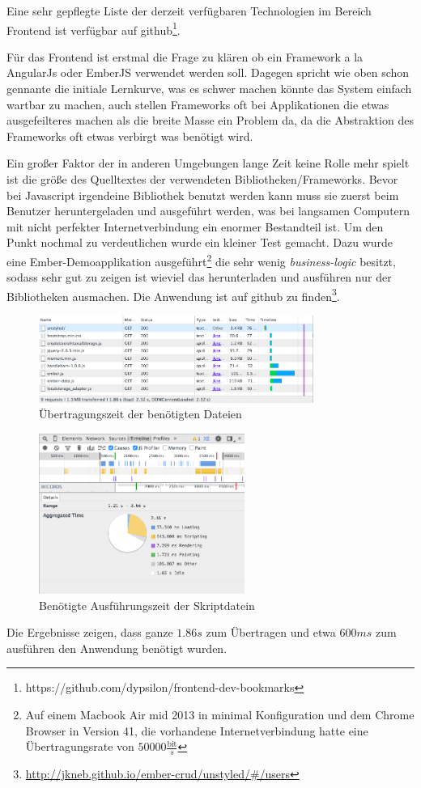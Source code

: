 \documentclass[12pt,twoside]{book}
\begin{document}
Eine sehr gepflegte Liste der derzeit verfügbaren Technologien im Bereich Frontend ist verfügbar auf github\footnote{https://github.com/dypsilon/frontend-dev-bookmarks}.

Für das Frontend ist erstmal die Frage zu klären ob ein Framework a la AngularJs oder EmberJS verwendet werden soll. Dagegen spricht wie oben schon gennante die initiale Lernkurve, was es schwer machen könnte das System einfach wartbar zu machen, auch stellen Frameworks oft bei Applikationen die etwas ausgefeilteres machen als die breite Masse ein Problem da, da die Abstraktion des Frameworks oft etwas verbirgt was benötigt wird.

Ein großer Faktor der in anderen Umgebungen lange Zeit keine Rolle mehr spielt ist die größe des Quelltextes der verwendeten Bibliotheken/Frameworks. Bevor bei Javascript irgendeine Bibliothek benutzt werden kann muss sie zuerst beim Benutzer heruntergeladen und ausgeführt werden, was bei langsamen Computern mit nicht perfekter Internetverbindung ein enormer Bestandteil ist. Um den Punkt nochmal zu verdeutlichen wurde ein kleiner Test gemacht. Dazu wurde eine Ember-Demoapplikation ausgeführt\footnote{Auf einem Macbook Air mid 2013 in minimal Konfiguration und dem Chrome Browser in Version 41, die vorhandene Internetverbindung hatte eine Übertragungsrate von $50000 \frac{\text{bit}}{s}$} die sehr wenig \textit{business-logic} besitzt, sodass sehr gut zu zeigen ist wieviel das herunterladen und ausführen nur der Bibliotheken ausmachen.
Die Anwendung ist auf github zu finden\footnote{\url{http://jkneb.github.io/ember-crud/unstyled/\#/users}}.
\begin{figure}[H]
    \centering
    \includegraphics[width=0.8\textwidth]{images/performance_1.png}
    \caption{Übertragungszeit der benötigten Dateien}
    \label{fig:awesome_image}
\end{figure}
\begin{figure}[H]
    \centering
    \includegraphics[width=0.6\textwidth]{images/performance_2.png}
    \caption{Benötigte Ausführungszeit der Skriptdatein}
    \label{fig:awesome_image}
\end{figure}
Die Ergebnisse zeigen, dass ganze $1.86s$ zum Übertragen und etwa $600ms$ zum ausführen den Anwendung benötigt wurden.
\end{document}
